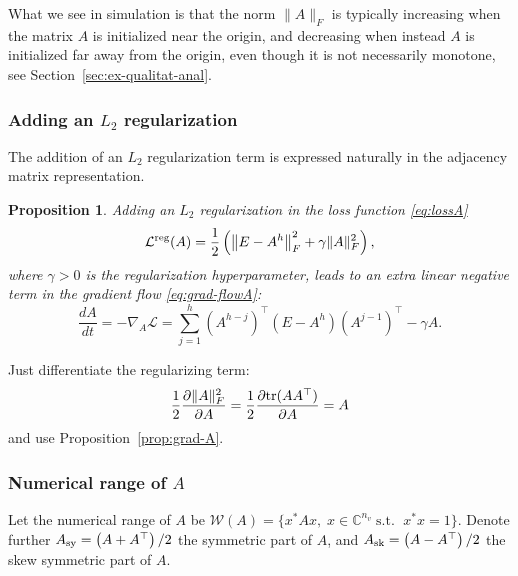 \documentclass{article}
\makeatletter
\renewenvironment{proof}[1][\proofname]{
  \par\pushQED{\qed}\normalfont
  \topsep6\p@\@plus6\p@\relax
  \trivlist\item[\hskip\labelsep\bfseries#1\@addpunct{.}]
  \ignorespaces
}{
  \popQED\endtrivlist\@endpefalse
}
\newtheorem{proposition}{Proposition}
\def\tr{{\rm tr}}
\newcommand{\1}{\mathds{1}}
\makeatother
\begin{document}
What we see in simulation is that the norm $ \| A\|_F $ is typically increasing when the matrix $ A $ is initialized near the origin, and decreasing when instead $ A$ is initialized far away from the origin, even though it is not necessarily monotone, see Section~\ref{sec:ex-qualitat-anal}.



\subsubsection{Adding an $L_2 $ regularization}
The addition of an $ L_2 $ regularization term is expressed naturally in the adjacency matrix representation.
\begin{proposition}
Adding an $ L_2 $ regularization in the loss function \eqref{eq:lossA} 
\begin{equation}
\mathcal{L}^{\rm reg}(A) = \frac{1}{2} \left( \left\| E- A^h \right\|_F^2 + \gamma \| A\|_F^2 \right),
\label{eq:lossA-reg}
\end{equation}
where $ \gamma >0 $ is the regularization hyperparameter, leads to an extra linear negative term in the gradient flow \eqref{eq:grad-flowA}:
\begin{equation}
	\frac{dA}{dt}= - \nabla_A \mathcal{L} = \sum_{j=1}^h \left(A^{h-j}\right)^\top \left( E - A^h \right) \left( A^{j-1}
 \right) ^\top - \gamma A .
 \label{eq:grad-flowA-reg}
\end{equation}
\end{proposition}

\begin{proof}
Just differentiate the regularizing term: \[
\frac{1}{2} \frac{\partial \| A\|_F^2}{\partial A} = \frac{1}{2} \frac{\partial \tr ( A A^\top ) }{\partial A} = A
\]
and use Proposition~\ref{prop:grad-A}.
\end{proof}


\subsubsection{Numerical range of $A$}

Let the numerical range of $A$ be $ \mathcal{W}(A) = \{ x^\ast A x, \; x \in \mathbb{C}^{n_v} \; \text{s.t. } \; x^\ast x =1 \}$. Denote further $ A_{\rm sy} = \left( A+A^\top\right)/2 $ the symmetric part of $A $, and $ A_{\rm sk}  = \left( A-A^\top\right)/2 $ the skew symmetric part of $A $. 
\end{document}
